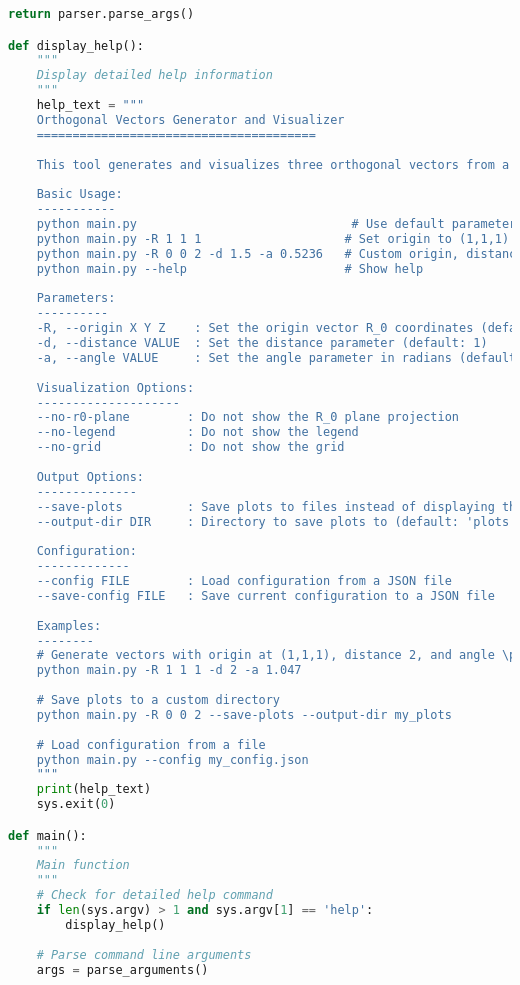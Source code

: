 \begin{lstlisting}[language=Python]
    return parser.parse_args()

def display_help():
    """
    Display detailed help information
    """
    help_text = """
    Orthogonal Vectors Generator and Visualizer
    =======================================
    
    This tool generates and visualizes three orthogonal vectors from a given origin point.
    
    Basic Usage:
    -----------
    python main.py                              # Use default parameters
    python main.py -R 1 1 1                    # Set origin to (1,1,1)
    python main.py -R 0 0 2 -d 1.5 -a 0.5236   # Custom origin, distance and angle
    python main.py --help                      # Show help
    
    Parameters:
    ----------
    -R, --origin X Y Z    : Set the origin vector R_0 coordinates (default: 0 0 0)
    -d, --distance VALUE  : Set the distance parameter (default: 1)
    -a, --angle VALUE     : Set the angle parameter in radians (default: \pi/4)
    
    Visualization Options:
    --------------------
    --no-r0-plane        : Do not show the R_0 plane projection
    --no-legend          : Do not show the legend
    --no-grid            : Do not show the grid
    
    Output Options:
    --------------
    --save-plots         : Save plots to files instead of displaying them
    --output-dir DIR     : Directory to save plots to (default: 'plots')
    
    Configuration:
    -------------
    --config FILE        : Load configuration from a JSON file
    --save-config FILE   : Save current configuration to a JSON file
    
    Examples:
    --------
    # Generate vectors with origin at (1,1,1), distance 2, and angle \pi/3
    python main.py -R 1 1 1 -d 2 -a 1.047
    
    # Save plots to a custom directory
    python main.py -R 0 0 2 --save-plots --output-dir my_plots
    
    # Load configuration from a file
    python main.py --config my_config.json
    """
    print(help_text)
    sys.exit(0)

def main():
    """
    Main function
    """
    # Check for detailed help command
    if len(sys.argv) > 1 and sys.argv[1] == 'help':
        display_help()
    
    # Parse command line arguments
    args = parse_arguments()
    

\end{lstlisting}
